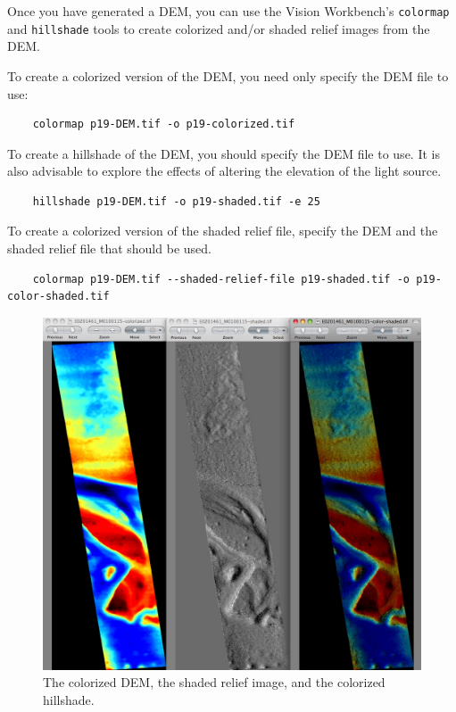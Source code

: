Once you have generated a DEM, you can use the Vision Workbench's
\texttt{colormap} and \texttt{hillshade} tools to create colorized
and/or shaded relief images from the DEM.

To create a colorized version of the DEM, you need only specify the
DEM file to use:

\begin{verbatim}
    colormap p19-DEM.tif -o p19-colorized.tif
\end{verbatim}

To create a hillshade of the DEM, you should specify the DEM file
to use. It is also advisable to explore the effects of altering the
elevation of the light source.

\begin{verbatim}
    hillshade p19-DEM.tif -o p19-shaded.tif -e 25
\end{verbatim}

To create a colorized version of the shaded relief file, specify
the DEM and the shaded relief file that should be used.

\begin{verbatim}
    colormap p19-DEM.tif --shaded-relief-file p19-shaded.tif -o p19-color-shaded.tif
\end{verbatim}

\begin{figure}
\begin{center}
\includegraphics[width=5in]{images/p19-colorized-shaded.png}
\caption[P19 colorized and shaded relief]{
    \label{p19-color}
	The colorized DEM, the shaded relief image, and the colorized hillshade.
    }
\end{center}
\end{figure}

